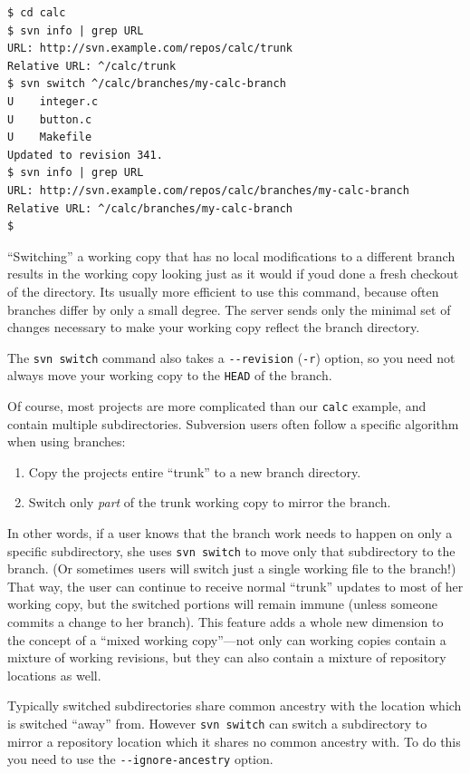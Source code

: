 \begin{verbatim}
$ cd calc
$ svn info | grep URL
URL: http://svn.example.com/repos/calc/trunk
Relative URL: ^/calc/trunk
$ svn switch ^/calc/branches/my-calc-branch
U    integer.c
U    button.c
U    Makefile
Updated to revision 341.
$ svn info | grep URL
URL: http://svn.example.com/repos/calc/branches/my-calc-branch
Relative URL: ^/calc/branches/my-calc-branch
$
\end{verbatim}

``Switching'' a working copy that has no local modifications to a
different branch results in the working copy looking just as it would if
you\textquotesingle d done a fresh checkout of the directory.
It\textquotesingle s usually more efficient to use this command, because
often branches differ by only a small degree. The server sends only the
minimal set of changes necessary to make your working copy reflect the
branch directory.

The \texttt{svn\ switch} command also takes a \texttt{-\/-revision}
(\texttt{-r}) option, so you need not always move your working copy to
the \texttt{HEAD} of the branch.

Of course, most projects are more complicated than our \texttt{calc}
example, and contain multiple subdirectories. Subversion users often
follow a specific algorithm when using branches:

\begin{enumerate}
\def\labelenumi{\arabic{enumi}.}
\item
  Copy the project\textquotesingle s entire ``trunk'' to a new branch
  directory.
\item
  Switch only \emph{part} of the trunk working copy to mirror the
  branch.
\end{enumerate}

In other words, if a user knows that the branch work needs to happen on
only a specific subdirectory, she uses \texttt{svn\ switch} to move only
that subdirectory to the branch. (Or sometimes users will switch just a
single working file to the branch!) That way, the user can continue to
receive normal ``trunk'' updates to most of her working copy, but the
switched portions will remain immune (unless someone commits a change to
her branch). This feature adds a whole new dimension to the concept of a
``mixed working copy''---not only can working copies contain a mixture
of working revisions, but they can also contain a mixture of repository
locations as well.

Typically switched subdirectories share common ancestry with the
location which is switched ``away'' from. However \texttt{svn\ switch}
can switch a subdirectory to mirror a repository location which it
shares no common ancestry with. To do this you need to use the
\texttt{-\/-ignore-ancestry} option.

